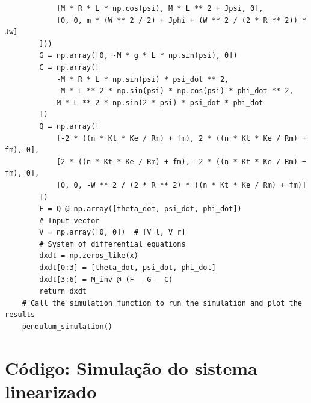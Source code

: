 \documentclass[10pt]{article}
\begin{document}
\begin{appendices}
\begin{verbatim}
            [M * R * L * np.cos(psi), M * L ** 2 + Jpsi, 0],
            [0, 0, m * (W ** 2 / 2) + Jphi + (W ** 2 / (2 * R ** 2)) * Jw]
        ]))
        G = np.array([0, -M * g * L * np.sin(psi), 0])
        C = np.array([
            -M * R * L * np.sin(psi) * psi_dot ** 2,
            -M * L ** 2 * np.sin(psi) * np.cos(psi) * phi_dot ** 2,
            M * L ** 2 * np.sin(2 * psi) * psi_dot * phi_dot
        ])
        Q = np.array([
            [-2 * ((n * Kt * Ke / Rm) + fm), 2 * ((n * Kt * Ke / Rm) + fm), 0],
            [2 * ((n * Kt * Ke / Rm) + fm), -2 * ((n * Kt * Ke / Rm) + fm), 0],
            [0, 0, -W ** 2 / (2 * R ** 2) * ((n * Kt * Ke / Rm) + fm)]
        ])
        F = Q @ np.array([theta_dot, psi_dot, phi_dot])
        # Input vector
        V = np.array([0, 0])  # [V_l, V_r]
        # System of differential equations
        dxdt = np.zeros_like(x)
        dxdt[0:3] = [theta_dot, psi_dot, phi_dot]
        dxdt[3:6] = M_inv @ (F - G - C)
        return dxdt
    # Call the simulation function to run the simulation and plot the results
    pendulum_simulation()
\end{verbatim}

\section{Código: Simulação do sistema linearizado}


\end{appendices}
\end{document}
